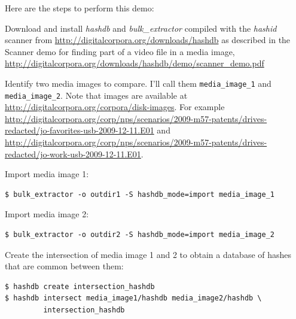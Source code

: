 \documentclass[12pt,twoside]{article}
\newcommand{\hdb}{\emph{hashdb}\xspace}
\newcommand{\bulk}{\emph{bulk\_extractor}\xspace}
\newcommand{\hashid}{\emph{hashid}\xspace}
\begin{document}
Here are the steps to perform this demo:
\begin{compactenum}
\item Download and install \hdb  and \bulk compiled with the \hashid scanner
from
\url{http://digitalcorpora.org/downloads/hashdb}
as described in the Scanner demo
for finding part of a video file in a media image,
\url{http://digitalcorpora.org/downloads/hashdb/demo/scanner\_demo.pdf}
\item Identify two media images to compare.
I'll call them \texttt{media\_image\_1} and \texttt{media\_image\_2}.
Note that images are available at
\url{http://digitalcorpora.org/corpora/disk-images}.
For example
\url{http://digitalcorpora.org/corp/nps/scenarios/2009-m57-patents/drives-redacted/jo-favorites-usb-2009-12-11.E01}
and
\url{http://digitalcorpora.org/corp/nps/scenarios/2009-m57-patents/drives-redacted/jo-work-usb-2009-12-11.E01}.

\item Import media image 1:
\begin{verbatim}
$ bulk_extractor -o outdir1 -S hashdb_mode=import media_image_1
\end{verbatim}

\item Import media image 2:
\begin{verbatim}
$ bulk_extractor -o outdir2 -S hashdb_mode=import media_image_2
\end{verbatim}

\item Create the intersection of media image 1 and 2
to obtain a database of hashes that are common between them:
\begin{verbatim}
$ hashdb create intersection_hashdb
$ hashdb intersect media_image1/hashdb media_image2/hashdb \
         intersection_hashdb
\end{verbatim}
\end{compactenum}
\end{document}
